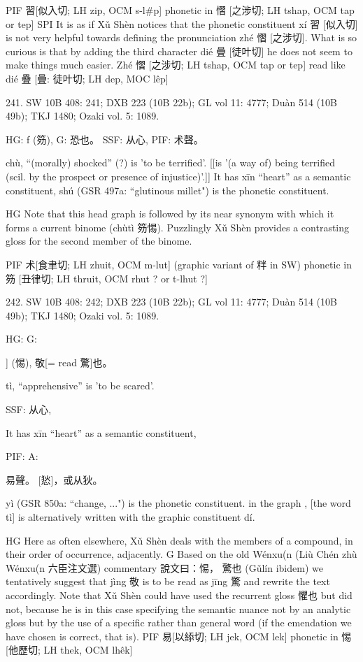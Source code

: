 PIF    習[似入切; LH zip, OCM s-l\#p] phonetic in 慴 [之涉切; LH tshap, OCM tap or tep]
SPI It is as if Xǔ Shèn notices that the phonetic constituent xí 習 [似入切] is not very helpful towards defining the pronunciation zhé 慴 [之涉切]. What is so curious is that by adding the third character dié 曡 [徒叶切] he does not seem to make things much easier.
Zhé 慴 [之涉切; LH tshap, OCM tap or tep] read like dié 疊 [曡: 徒叶切; LH dep, MOC lêp]

241. SW 10B 408: 241; DXB 223 (10B 22b); GL vol 11: 4777; Duàn 514 (10B 49b); TKJ 1480; Ozaki vol. 5: 1089.

HG: ƒ (䇟),
G:	恐也。
SSF: 从心,
PIF: 术聲。


chù, ``(morally) shocked'' (?)
is 'to be terrified'. [[is '(a way of) being terrified (scil. by the prospect or presence of injustice)'.]]
It has xīn ``heart'' as a semantic constituent,
shú (GSR 497a: ``glutinous millet") is the phonetic constituent.

HG   Note that this head graph is followed by its near synonym with which it forms a current binome (chùtì 䇟惕). Puzzlingly Xǔ Shèn provides a contrasting gloss for the second member of the binome.



PIF     术[食聿切; LH zhuit, OCM m-lut] (graphic variant of 䉽 in SW) phonetic in 䇟 [丑律切; LH thruit, OCM rhut ? or t-lhut ?]


242. SW 10B 408: 242; DXB 223 (10B 22b); GL vol 11: 4777; Duàn 514 (10B 49b); TKJ 1480; Ozaki vol. 5: 1089.


HG:
G:

] (惕),
敬[= read 驚]也。

tì, ``apprehensive'' is 'to be scared'.

SSF: 从心,

It has xīn ``heart'' as a semantic constituent,

PIF: A:

易聲。
[悐]，或从狄。

yì (GSR 850a: ``change, ...") is the phonetic constituent. in the graph , [the word tì] is alternatively written with the graphic constituent dí.

HG Here as often elsewhere, Xǔ Shèn deals with the members of a compound, in their order of occurrence, adjacently.
G    Based on the old Wénxu(n (Liù Chén zhù Wénxu(n 六臣注文選) commentary 說文曰：惕， 驚也 (Gǔlín ibidem) we tentatively suggest that jìng 敬 is to be read as jīng 驚 and rewrite the text accordingly.
    Note that Xǔ Shèn could have used the recurrent gloss 懼也 but did not, because he is in this case specifying the semantic nuance not by an analytic gloss but by the use of a specific rather than general word (if the emendation we have chosen is correct, that is).
PIF    易[以䋬切; LH jek, OCM lek] phonetic in 惕 [他歷切; LH thek, OCM lhêk]

